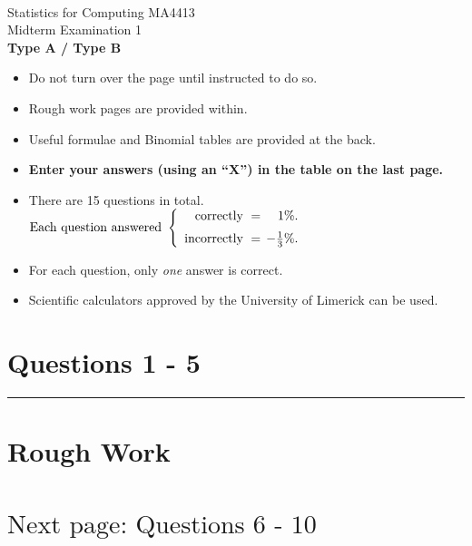 \documentclass[12pt]{article}
\begin{document}
\quad\\[2cm]

\begin{center}
{\Huge Statistics for Computing MA4413\\[0.8cm]
Midterm Examination 1\\[1cm]
{\bf Type A / Type B}}\\[2cm]
\end{center}

\begin{itemize}\itemsep0.6cm
\item Do not turn over the page until instructed to do so.
\item Rough work pages are provided within.
\item Useful formulae and Binomial tables are provided at the back.
\item {\bf Enter your answers (using an ``X'') in the table on the last page.}
\item There are 15 questions in total.
$
\text{Each question answered } \left\{\begin{array}{rr}
\text{correctly } = & \hspace{-0.2cm}1\%. \\[0.2cm]
\text{incorrectly } = & \hspace{-0.2cm}-\tfrac{1}{3}\%.
\end{array}\right.
$
\item For each question, only \emph{one} answer is correct.
\item Scientific calculators approved by the University of Limerick can be used.
\end{itemize}

\newpage
\section*{Questions 1 - 5}

\rule{\linewidth}{1pt}
\quad


\newpage

\section*{Rough Work\\[23cm]}
\section*{\hspace{8cm}$\boxed{\text{Next page: Questions 6 - 10}}$}
\end{document}
